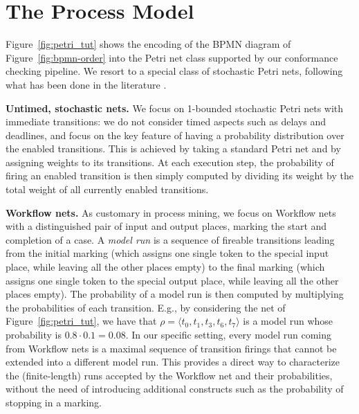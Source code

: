 \section{The Process Model}
Figure~\ref{fig:petri_tut} shows the encoding of the BPMN diagram of Figure~\ref{fig:bpmn-order} into the Petri net class supported by our conformance checking pipeline. We resort to a special class of stochastic Petri nets, following what has been done in the literature \cite{DBLP:conf/bpm/LeemansSA19,DBLP:journals/tosem/PolyvyanyySWCM20}. %


\noindent
\textbf{Untimed, stochastic nets.}
We focus on 1-bounded stochastic Petri nets with immediate transitions: we do not consider timed aspects such as delays and deadlines, and focus on the key feature of having a probability distribution over the enabled transitions. This is achieved by taking a standard Petri net and by assigning weights to its transitions. At each execution step, the probability of firing an enabled transition is then simply computed by dividing its weight by the total weight of all currently enabled transitions.


\noindent
\textbf{Workflow nets.} As customary in process mining, we focus on Workflow nets with a distinguished pair of input and output places, marking the start and completion of a case. A \emph{model run} is a sequence of fireable transitions leading from the initial marking (which assigns one single token to the special input place, while leaving all the other places empty) to the final marking (which assigns one single token to the special output place, while leaving all the other places empty). The probability of a model run is then computed by multiplying the probabilities of each transition. E.g., by considering the net of Figure~\ref{fig:petri_tut}, we have that $\rho = \langle t_0,t_1,t_3,t_6,t_7\rangle$ is a model run whose probability is $0.8 \cdot 0.1 = 0.08$. In our specific setting, every model run coming from Workflow nets is a maximal sequence of transition firings that cannot be extended into a different model run. This provides a direct way to characterize the (finite-length) runs accepted by the Workflow net and their probabilities, without the need of introducing additional constructs such as the probability of stopping in a marking.



